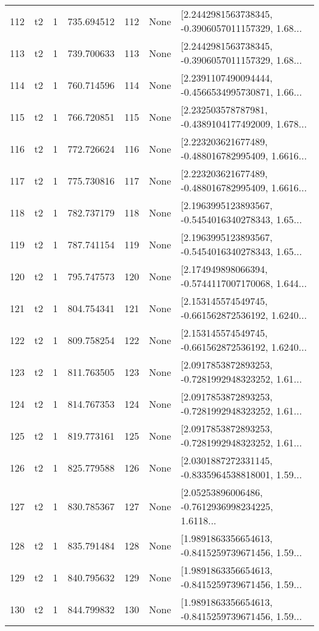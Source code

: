 \begin{tabular}{lllrlll}
112 &  t2 &   1 &   735.694512 &  112 &  None &  [2.2442981563738345, -0.3906057011157329, 1.68... \\
113 &  t2 &   1 &   739.700633 &  113 &  None &  [2.2442981563738345, -0.3906057011157329, 1.68... \\
114 &  t2 &   1 &   760.714596 &  114 &  None &  [2.2391107490094444, -0.4566534995730871, 1.66... \\
115 &  t2 &   1 &   766.720851 &  115 &  None &  [2.232503578787981, -0.4389104177492009, 1.678... \\
116 &  t2 &   1 &   772.726624 &  116 &  None &  [2.223203621677489, -0.488016782995409, 1.6616... \\
117 &  t2 &   1 &   775.730816 &  117 &  None &  [2.223203621677489, -0.488016782995409, 1.6616... \\
118 &  t2 &   1 &   782.737179 &  118 &  None &  [2.1963995123893567, -0.5454016340278343, 1.65... \\
119 &  t2 &   1 &   787.741154 &  119 &  None &  [2.1963995123893567, -0.5454016340278343, 1.65... \\
120 &  t2 &   1 &   795.747573 &  120 &  None &  [2.174949898066394, -0.5744117007170068, 1.644... \\
121 &  t2 &   1 &   804.754341 &  121 &  None &  [2.153145574549745, -0.661562872536192, 1.6240... \\
122 &  t2 &   1 &   809.758254 &  122 &  None &  [2.153145574549745, -0.661562872536192, 1.6240... \\
123 &  t2 &   1 &   811.763505 &  123 &  None &  [2.0917853872893253, -0.7281992948323252, 1.61... \\
124 &  t2 &   1 &   814.767353 &  124 &  None &  [2.0917853872893253, -0.7281992948323252, 1.61... \\
125 &  t2 &   1 &   819.773161 &  125 &  None &  [2.0917853872893253, -0.7281992948323252, 1.61... \\
126 &  t2 &   1 &   825.779588 &  126 &  None &  [2.0301887272331145, -0.8335964538818001, 1.59... \\
127 &  t2 &   1 &   830.785367 &  127 &  None &  [2.05253896006486, -0.7612936998234225, 1.6118... \\
128 &  t2 &   1 &   835.791484 &  128 &  None &  [1.9891863356654613, -0.8415259739671456, 1.59... \\
129 &  t2 &   1 &   840.795632 &  129 &  None &  [1.9891863356654613, -0.8415259739671456, 1.59... \\
130 &  t2 &   1 &   844.799832 &  130 &  None &  [1.9891863356654613, -0.8415259739671456, 1.59... \\

\end{tabular}

